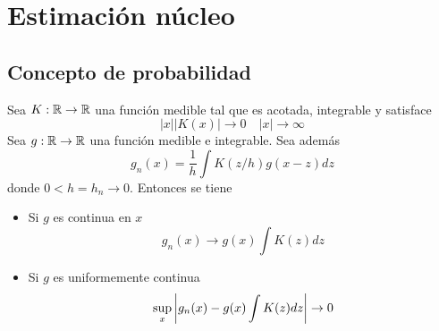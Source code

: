 \documentclass[MyPE.tex]{subfiles}
\begin{document}
\chapter{Estimación núcleo}
\section{Concepto de probabilidad}
\begin{theorem}
Sea $K:\mathbb{R}\to\mathbb{R}$ una función medible tal que es acotada, integrable y satisface
$$
|x||K(x)|\to 0 \quad |x|\to \infty
$$
Sea $g:\mathbb{R}\to\mathbb{R}$ una función medible e integrable. Sea además
$$
g_n(x) = \frac{1}{h}\int K(z/h)g(x-z)dz
$$
donde $0<h=h_n \to 0$. Entonces se tiene
\begin{itemize}
\item Si $g$ es continua en $x$ 
$$
g_n(x)\to g(x)\int K(z)dz
$$
\item Si $g$ es uniformemente continua
$$
\sup_x \left\lvert g_n(x)-g(x)\int K(z)dz\right\rvert\to 0
$$
\end{itemize}
\end{theorem} 
\end{document}
